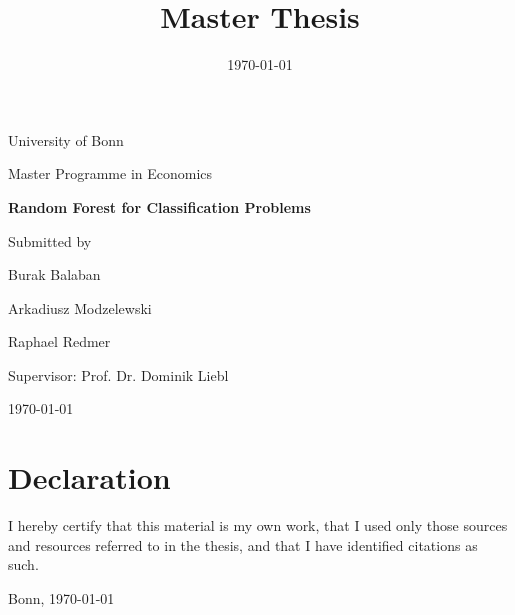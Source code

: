 \documentclass[ twoside=false, 12pt,  footinclude=true,  headinclude=true,  cleardoublepage=empty]{scrbook}
\title{Master Thesis}
\date{\today}
\begin{document}
	\begin{titlepage}
		\centering
		University of Bonn
		
		 Master Programme in Economics
		\vspace{1in}
		\vspace{1in}
		
		{\LARGE \bfseries  Random Forest for Classification Problems}
		\vspace{1in}
		
		{\large Submitted by}
		
		{\LARGE Burak Balaban \par
				Arkadiusz Modzelewski\par
				Raphael Redmer\par}
		
		\vspace{1in}
		
			Supervisor: Prof. Dr. Dominik Liebl
			
		\vfill
		
		\begin{flushleft}
			\today
		\end{flushleft}
		
	\end{titlepage}
	
	
	
	\frontmatter

\tableofcontents



\mainmatter











\printbibliography


\chapter*{Declaration}
I hereby certify that this material is my own work, that I used only those sources and resources referred to in the thesis, and that I have identified citations as such.
		
\vspace{0.3in}

\noindent Bonn, \today
\end{document}
